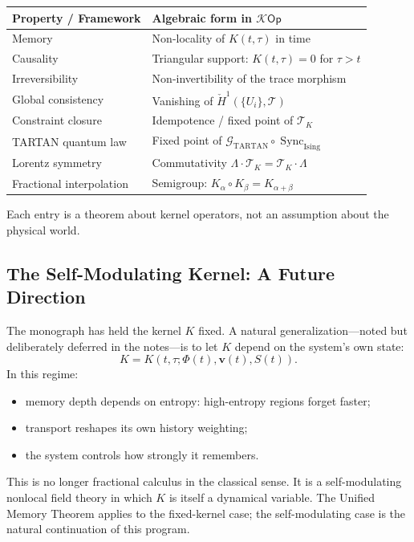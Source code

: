 \documentclass[12pt]{article}
\newcommand{\Kcal}{\mathcal{K}}
\newcommand{\TK}{\mathcal{T}_K}
\begin{document}
\medskip
\begin{center}
\renewcommand{\arraystretch}{1.4}
\begin{tabular}{ll}
\toprule
\textbf{Property / Framework} & \textbf{Algebraic form in $\Kcal\mathsf{Op}$} \\
\midrule
Memory & Non-locality of $K(t,\tau)$ in time \\
Causality & Triangular support: $K(t,\tau) = 0$ for $\tau > t$ \\
Irreversibility & Non-invertibility of the trace morphism \\
Global consistency & Vanishing of $\check{H}^1(\{U_i\}, \mathscr{T})$ \\
Constraint closure & Idempotence / fixed point of $\mathcal{T}_K$ \\
TARTAN quantum law & Fixed point of $\mathcal{G}_{\mathrm{TARTAN}}\circ\operatorname{Sync}_{\mathrm{Ising}}$ \\
Lorentz symmetry & Commutativity $\Lambda\cdot\TK = \TK\cdot\Lambda$ \\
Fractional interpolation & Semigroup: $K_\alpha\circ K_\beta = K_{\alpha+\beta}$ \\
\bottomrule
\end{tabular}
\end{center}
\medskip

Each entry is a theorem about kernel operators, not an assumption about
the physical world.

\subsection{The Self-Modulating Kernel: A Future Direction}

The monograph has held the kernel $K$ fixed. A natural generalization---noted
but deliberately deferred in the notes---is to let $K$ depend on the
system's own state:
\[
  K = K(t,\tau;\Phi(t),\mathbf{v}(t),S(t)).
\]
In this regime:
\begin{itemize}
  \item memory depth depends on entropy: high-entropy regions forget faster;
  \item transport reshapes its own history weighting;
  \item the system controls how strongly it remembers.
\end{itemize}

This is no longer fractional calculus in the classical sense. It is a
self-modulating nonlocal field theory in which $K$ is itself a dynamical
variable. The Unified Memory Theorem applies to the fixed-kernel case; the
self-modulating case is the natural continuation of this program.
\end{document}
